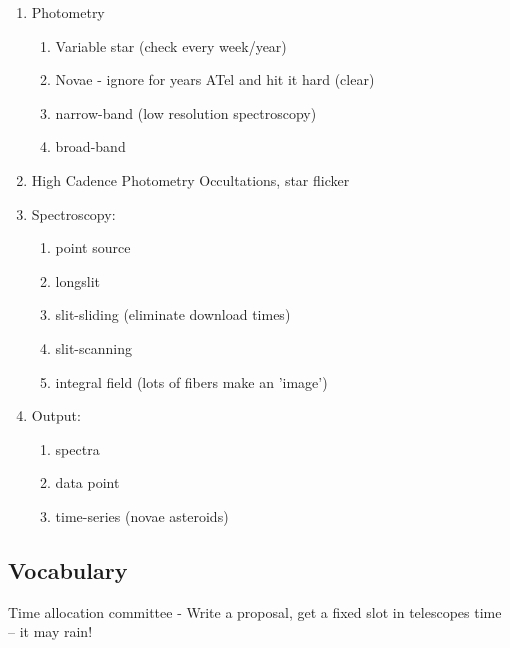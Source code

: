 \documentclass[letter,11pt,oneside]{article}
\begin{document}
\vspace{-.15cm}
\begin{enumerate}\addtolength{\itemsep}{-0.5\baselineskip}
   \item  Photometry
\vspace{-.15cm}
\begin{enumerate}\addtolength{\itemsep}{-0.5\baselineskip}
   \item    Variable star (check every week/year)
   \item    Novae - ignore for years ATel and hit it hard (clear)
   \item    narrow-band (low resolution spectroscopy)
   \item    broad-band
\end{enumerate}
   \item  High Cadence Photometry
   Occultations, star flicker

   \item  Spectroscopy:
\vspace{-.15cm}
\begin{enumerate}\addtolength{\itemsep}{-0.5\baselineskip}
   \item    point source
   \item    longslit                                              
   \item    slit-sliding (eliminate download times)
   \item    slit-scanning
   \item    integral field (lots of fibers make an 'image')
\end{enumerate}

   \item  Output:
\vspace{-.15cm}
\begin{enumerate}\addtolength{\itemsep}{-0.5\baselineskip}
   \item    spectra
   \item    data point
   \item    time-series (novae asteroids)
\end{enumerate}

\end{enumerate}

\subsection{Vocabulary}

Time allocation committee - Write a proposal, get a fixed slot in telescopes
   time -- it may rain!
\end{document}
